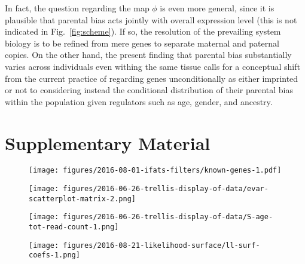 \documentclass[letterpaper]{article}
\begin{document}
In fact, the question regarding the map \(\phi\) is even more general, since
it is plausible that parental bias acts jointly with overall expression level
(this is not indicated in Fig.~\ref{fig:scheme}).  If so, the resolution of
the prevailing system biology is to be refined from mere genes to separate
maternal and paternal copies.  On the other hand, the present finding that
parental bias substantially varies across individuals even withing the same
tissue calls for a conceptual shift from the current practice of regarding
genes unconditionally as either imprinted or not to considering instead the
conditional distribution of their parental bias within the population given
regulators such as age, gender, and ancestry.



\section{Supplementary Material}


\setcounter{figure}{0}
\makeatletter 
\renewcommand{\thefigure}{S\@arabic\c@figure}
\makeatother

\begin{figure}
\begin{center}
\texttt{[image: figures/2016-08-01-ifats-filters/known-genes-1.pdf]}
\caption{}
\label{fig:known-genes}
\end{center}
\end{figure}

\begin{figure}
\begin{center}
\texttt{[image: figures/2016-06-26-trellis-display-of-data/evar-scatterplot-matrix-2.png]}
\end{center}
\caption{}
\label{fig:predictor-associations}
\end{figure}

\begin{figure}
\begin{center}
\texttt{[image: figures/2016-06-26-trellis-display-of-data/S-age-tot-read-count-1.png]}
\end{center}
\caption{}
\label{fig:weight-of-evidence}
\end{figure}

\begin{figure}
\begin{center}
\texttt{[image: figures/2016-08-21-likelihood-surface/ll-surf-coefs-1.png]}
\end{center}
\caption{}
\label{fig:likelihood-surface}
\end{figure}
\end{document}
